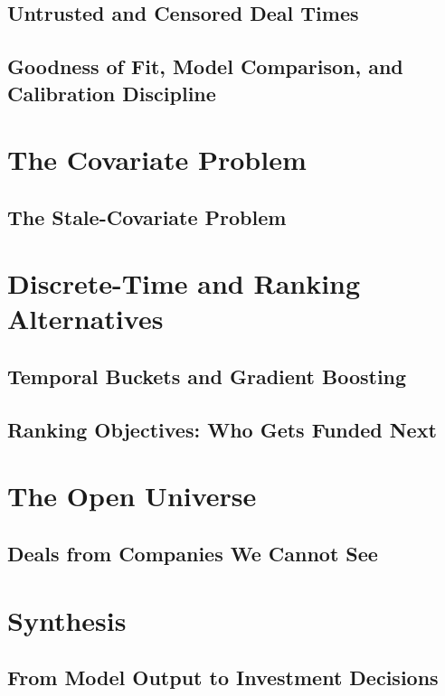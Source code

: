 \documentclass[11pt,a4paper,twoside,openany]{book}
\theoremstyle{plain}
\theoremstyle{definition}
\theoremstyle{remark}
\begin{document}
\chapter{Untrusted and Censored Deal Times}\label{ch:censoring}


\chapter{Goodness of Fit, Model Comparison, and Calibration Discipline}\label{ch:gof}


\part{The Covariate Problem}
\chapter{The Stale-Covariate Problem}\label{ch:stale}


\part{Discrete-Time and Ranking Alternatives}
\chapter{Temporal Buckets and Gradient Boosting}\label{ch:buckets}


\chapter{Ranking Objectives: Who Gets Funded Next}\label{ch:ranking}


\part{The Open Universe}
\chapter{Deals from Companies We Cannot See}\label{ch:universe}


\part{Synthesis}
\chapter{From Model Output to Investment Decisions}\label{ch:decision}

\end{document}
